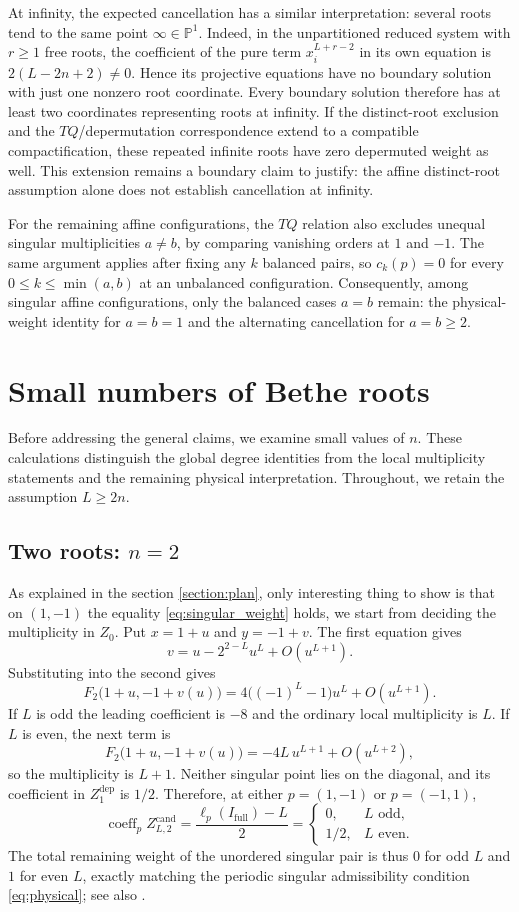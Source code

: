 \documentclass[11pt]{article}
\theoremstyle{definition}
\begin{document}
At infinity, the expected cancellation has a similar interpretation:
several roots tend to the same point $\infty\in\mathbb P^1$.
Indeed, in the unpartitioned reduced system with $r\ge1$ free roots,
the coefficient of the pure term $x_i^{L+r-2}$ in its own equation is
$2(L-2n+2)\ne0$. Hence its projective equations have no boundary
solution with just one nonzero root coordinate. Every boundary
solution therefore has at least two coordinates representing roots
at infinity. If the distinct-root exclusion and the
$TQ$/depermutation correspondence extend to a compatible
compactification, these repeated infinite roots have zero depermuted
weight as well. This extension remains a boundary claim to justify:
the affine distinct-root assumption alone does not establish
cancellation at infinity.

For the remaining affine configurations, the $TQ$ relation also
excludes unequal singular multiplicities $a\ne b$, by comparing
vanishing orders at $1$ and $-1$. The same argument applies after
fixing any $k$ balanced pairs, so $c_k(p)=0$ for every
$0\le k\le\min(a,b)$ at an unbalanced configuration.
Consequently, among singular affine configurations, only
the balanced cases $a=b$ remain: the physical-weight identity for
$a=b=1$ and the alternating cancellation for $a=b\ge2$.

\section{Small numbers of Bethe roots}
Before addressing the general claims, we examine small values of $n$.
These calculations distinguish the global degree identities from the
local multiplicity statements and the remaining physical interpretation.
Throughout, we retain the assumption $L\ge2n$.

\subsection{Two roots: $n=2$}

As explained in the section \ref{section:plan},  only interesting thing to show is that on $(1,-1)$ the equality \ref{eq:singular_weight} holds, we start from deciding the multiplicity in $Z_0$.
Put $x=1+u$ and $y=-1+v$. The first equation gives
\[
 v=u-2^{2-L}u^L+O(u^{L+1}).
\]
Substituting into the second gives
\[
 F_2\bigl(1+u,-1+v(u)\bigr)
 =4\bigl((-1)^L-1\bigr)u^L+O(u^{L+1}).
\]
If $L$ is odd the leading coefficient is $-8$ and the ordinary local
multiplicity is $L$. If $L$ is even, the next term is
\[
 F_2\bigl(1+u,-1+v(u)\bigr)
 =-4L\,u^{L+1}+O(u^{L+2}),
\]
so the multiplicity is $L+1$. Neither singular point lies on the
diagonal, and its coefficient in $Z^{\mathrm{dep}}_1$ is $1/2$.
Therefore, at either $p=(1,-1)$ or $p=(-1,1)$,
\[
 \operatorname{coeff}_p Z^{\mathrm{cand}}_{L,2}
 =\frac{\ell_p(I_{\mathrm{full}})-L}{2}
 =\begin{cases}
 0,&L\text{ odd},\\
 1/2,&L\text{ even}.
 \end{cases}
\]
The total remaining weight of the unordered singular pair is thus $0$
for odd $L$ and $1$ for even $L$, exactly matching the periodic singular
admissibility condition \eqref{eq:physical}; see also \cite{NW2013}.
\end{document}
